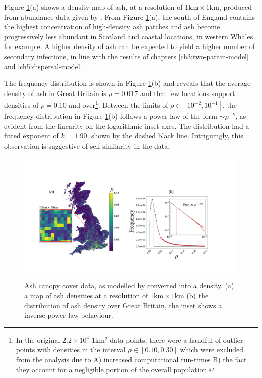 Figure \ref{fig:ash-host-data}(a) shows a density map of ash, at a resolution of $\mathrm{1km}\times \mathrm{1km}$, produced from abundance data given by \cite{hill.data}. 
From Figure \ref{fig:ash-host-data}(a), the south of England contains the highest concentration of high-density ash patches and ash become progressively less abundant in Scotland and coastal locations, 
in western Whales for example. 
A higher density of ash can be expected to yield a higher number of secondary infections, in line with the results of chapters \ref{ch3:two-param-model} and \ref{ch5:dispersal-model}.
 
The frequency distribution is shown in Figure \ref{fig:ash-host-data}(b) and reveals that the average density of ash in Great Britain is $\rho=0.017$ 
and that few locations support densities of $\rho=0.10$ and over\footnote{
In the original $2.2\times 10^4$ $1\mathrm{km^2}$ data points, there were a handful of outlier points with densities in the interval $\rho \in [0.10, 0.30]$ which were excluded from the analysis
due to A) increased computational run-times B) the fact they account for a negligible portion of the overall population.}. 
Between the limits of $\rho \in [10^{-2}, 10^{-1}]$, the frequency distribution in Figure \ref{fig:ash-host-data}(b) follows a power law of the form $\sim \rho ^{-k}$, 
as evident from the linearity on the logarithmic inset axes.
The distribution had a fitted exponent of $k=1.90$, shown by the dashed black line. Intriguingly, this observation is suggestive of self-similarity in the data.

\begin{figure}
    \centering
    \includegraphics[scale=0.30]{chapter6/figures/fig3-ash-data.pdf}
    \caption{Ash canopy cover data, as modelled by \cite{hill.data} converted into a density. (a) a map of ash densities at a resolution of $1\mathrm{km} \times 1\mathrm{km}$ (b) the distribution of ash density over Great Britain, the inset shows a inverse power law behaviour.}
    \label{fig:ash-host-data}
\end{figure}

